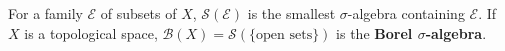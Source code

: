 For a family $\mathcal{E}$ of subsets of $X$, $\mathcal{S}(\mathcal{E})$ is the smallest $\sigma$-algebra containing $\mathcal{E}$. If $X$ is a topological space, $\mathcal{B}(X) = \mathcal{S}(\{\text{open sets}\})$ is the \textbf{Borel $\sigma$-algebra}.
